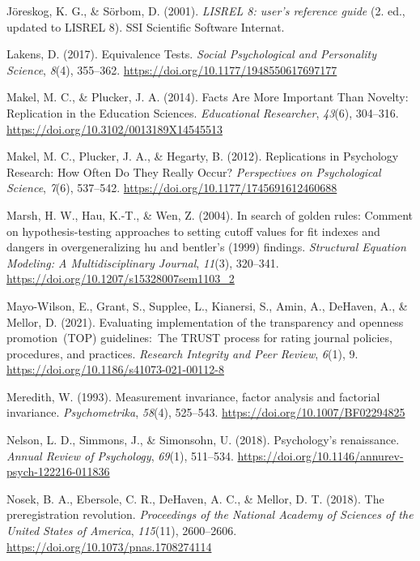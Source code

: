 \documentclass[
  man,floatsintext]{apa7}
\newlength{\cslhangindent}
\newenvironment{CSLReferences}[2] %
 {\begin{list}{}{%
  \setlength{\itemindent}{0pt}
  \setlength{\leftmargin}{0pt}
  \setlength{\parsep}{0pt}
  \ifodd #1
   \setlength{\leftmargin}{\cslhangindent}
   \setlength{\itemindent}{-1\cslhangindent}
  \fi
  \setlength{\itemsep}{#2\baselineskip}}}
 {\end{list}}
\begin{document}
\begin{CSLReferences}{1}{0}
Jöreskog, K. G., \& Sörbom, D. (2001). \emph{LISREL 8: user's reference guide} (2. ed., updated to LISREL 8). SSI Scientific Software Internat.

Lakens, D. (2017). Equivalence Tests. \emph{Social Psychological and Personality Science}, \emph{8}(4), 355--362. \url{https://doi.org/10.1177/1948550617697177}

Makel, M. C., \& Plucker, J. A. (2014). Facts Are More Important Than Novelty: Replication in the Education Sciences. \emph{Educational Researcher}, \emph{43}(6), 304--316. \url{https://doi.org/10.3102/0013189X14545513}

Makel, M. C., Plucker, J. A., \& Hegarty, B. (2012). Replications in Psychology Research: How Often Do They Really Occur? \emph{Perspectives on Psychological Science}, \emph{7}(6), 537--542. \url{https://doi.org/10.1177/1745691612460688}

Marsh, H. W., Hau, K.-T., \& Wen, Z. (2004). In search of golden rules: Comment on hypothesis-testing approaches to setting cutoff values for fit indexes and dangers in overgeneralizing hu and bentler's (1999) findings. \emph{Structural Equation Modeling: A Multidisciplinary Journal}, \emph{11}(3), 320--341. \url{https://doi.org/10.1207/s15328007sem1103_2}

Mayo-Wilson, E., Grant, S., Supplee, L., Kianersi, S., Amin, A., DeHaven, A., \& Mellor, D. (2021). Evaluating implementation of the transparency and openness promotion~(TOP) guidelines:~The TRUST process for rating journal policies, procedures, and practices. \emph{Research Integrity and Peer Review}, \emph{6}(1), 9. \url{https://doi.org/10.1186/s41073-021-00112-8}

Meredith, W. (1993). Measurement invariance, factor analysis and factorial invariance. \emph{Psychometrika}, \emph{58}(4), 525--543. \url{https://doi.org/10.1007/BF02294825}

Nelson, L. D., Simmons, J., \& Simonsohn, U. (2018). Psychology's renaissance. \emph{Annual Review of Psychology}, \emph{69}(1), 511--534. \url{https://doi.org/10.1146/annurev-psych-122216-011836}

Nosek, B. A., Ebersole, C. R., DeHaven, A. C., \& Mellor, D. T. (2018). The preregistration revolution. \emph{Proceedings of the National Academy of Sciences of the United States of America}, \emph{115}(11), 2600--2606. \url{https://doi.org/10.1073/pnas.1708274114}


\end{CSLReferences}
\end{document}

